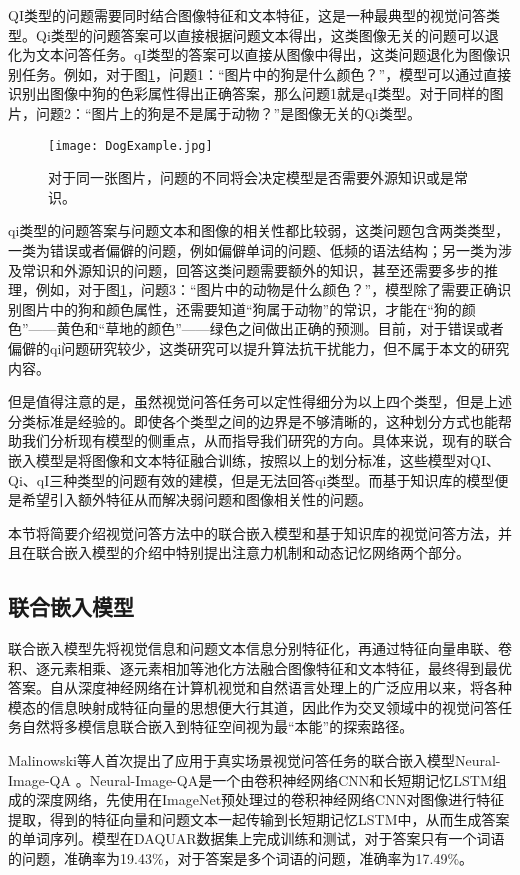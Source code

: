 QI类型的问题需要同时结合图像特征和文本特征，这是一种最典型的视觉问答类型。Qi类型的问题答案可以直接根据问题文本得出，这类图像无关的问题可以退化为文本问答任务。qI类型的答案可以直接从图像中得出，这类问题退化为图像识别任务。例如，对于图\ref{DogExample}，问题1：“图片中的狗是什么颜色？”，模型可以通过直接识别出图像中狗的色彩属性得出正确答案，那么问题1就是qI类型。对于同样的图片，问题2：“图片上的狗是不是属于动物？”是图像无关的Qi类型。
\begin{figure}[H]
	\texttt{[image: DogExample.jpg]}
	\caption{对于同一张图片，问题的不同将会决定模型是否需要外源知识或是常识。}
	\label{DogExample}
\end{figure}

qi类型的问题答案与问题文本和图像的相关性都比较弱，这类问题包含两类类型，一类为错误或者偏僻的问题，例如偏僻单词的问题、低频的语法结构；另一类为涉及常识和外源知识的问题，回答这类问题需要额外的知识，甚至还需要多步的推理，例如，对于图\ref{DogExample}，问题3：“图片中的动物是什么颜色？”，模型除了需要正确识别图片中的狗和颜色属性，还需要知道“狗属于动物”的常识，才能在“狗的颜色”——黄色和“草地的颜色”——绿色之间做出正确的预测。目前，对于错误或者偏僻的qi问题研究较少，这类研究可以提升算法抗干扰能力，但不属于本文的研究内容。

但是值得注意的是，虽然视觉问答任务可以定性得细分为以上四个类型，但是上述分类标准是经验的。即使各个类型之间的边界是不够清晰的，这种划分方式也能帮助我们分析现有模型的侧重点，从而指导我们研究的方向。具体来说，现有的联合嵌入模型是将图像和文本特征融合训练，按照以上的划分标准，这些模型对QI、Qi、qI三种类型的问题有效的建模，但是无法回答qi类型。而基于知识库的模型便是希望引入额外特征从而解决弱问题和图像相关性的问题。

本节将简要介绍视觉问答方法中的联合嵌入模型和基于知识库的视觉问答方法，并且在联合嵌入模型的介绍中特别提出注意力机制和动态记忆网络两个部分。

\subsection{联合嵌入模型}
联合嵌入模型先将视觉信息和问题文本信息分别特征化，再通过特征向量串联、卷积、逐元素相乘、逐元素相加等池化方法融合图像特征和文本特征，最终得到最优答案。自从深度神经网络在计算机视觉和自然语言处理上的广泛应用以来，将各种模态的信息映射成特征向量的思想便大行其道，因此作为交叉领域中的视觉问答任务自然将多模信息联合嵌入到特征空间视为最“本能”的探索路径。

Malinowski等人首次提出了应用于真实场景视觉问答任务的联合嵌入模型Neural-Image-QA
。Neural-Image-QA是一个由卷积神经网络CNN和长短期记忆LSTM组成的深度网络，先使用在ImageNet预处理过的卷积神经网络CNN对图像进行特征提取，得到的特征向量和问题文本一起传输到长短期记忆LSTM中，从而生成答案的单词序列。模型在DAQUAR数据集上完成训练和测试，对于答案只有一个词语的问题，准确率为19.43\%，对于答案是多个词语的问题，准确率为17.49\%。


